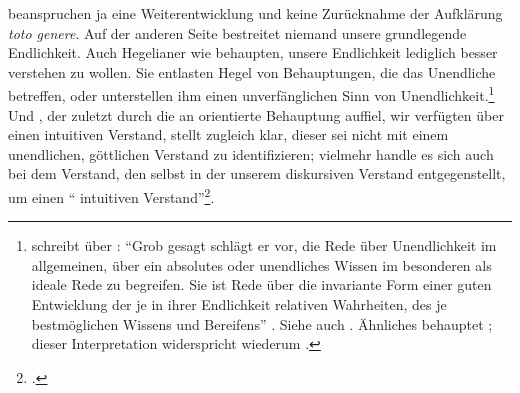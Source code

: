beanspruchen ja eine Weiterentwicklung und keine Zurücknahme der Aufklärung
\emph{toto genere}. Auf der anderen Seite bestreitet niemand unsere grundlegende
Endlichkeit. Auch Hegelianer wie 
behaupten, unsere Endlichkeit lediglich besser verstehen zu wollen. Sie
entlasten Hegel von Behauptungen, die das Unendliche betreffen,
oder unterstellen ihm einen unverfänglichen Sinn von
Unendlichkeit.\footnote{
schreibt über : \enquote{Grob gesagt schlägt er vor, die Rede über
Unendlichkeit im allgemeinen, über ein absolutes oder unendliches Wissen im
besonderen als ideale Rede zu begreifen. Sie ist Rede über die invariante Form
einer guten Entwicklung der je in ihrer Endlichkeit relativen Wahrheiten, des je
bestmöglichen Wissens und Bereifens}
\parencite[][186]{Stekeler-Weithofer:PhilosophiedesSelbstbewusstseins2005}.
Siehe auch \cite[][98]{Stekeler-Weithofer:TheQuestionofSystem2006}.
Ähnliches behauptet
\cite{Chiereghin:WozuHegelineinemZeitalterderEndlichkeit?1998}; dieser
Interpretation widerspricht wiederum \cite{Philipsen:NichtsalsKontexte2000}.}
Und , der zuletzt durch
die an  orientierte Behauptung auffiel, wir
verfügten über einen intuitiven Verstand, stellt zugleich klar, dieser
sei nicht mit einem unendlichen, göttlichen
Verstand zu identifizieren; vielmehr handle es sich auch bei dem Verstand, den
 selbst in der  unserem
diskursiven Verstand entgegenstellt, um einen \enquote{
intuitiven
Verstand}\footnote{\cite[][256]{Foerster:Die25JahrederPhilosophie2011}.}.


